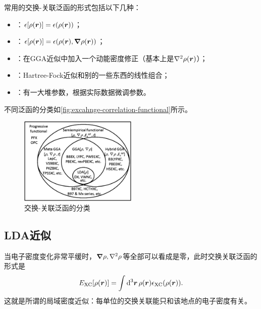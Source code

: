 常用的交换-关联泛函的形式包括以下几种：
\begin{itemize}
    \item {}：$\epsilon[\rho(\vb*{r})] = \epsilon(\rho(\vb*{r}))$；
    \item {}：$\epsilon[\rho(\vb*{r})] = \epsilon(\rho(\vb*{r}), \grad{\rho(\vb*{r})})$；
    \item {}：在GGA近似中加入一个动能密度修正（基本上是$\laplacian \rho(\vb*{r})$）；
    \item {}：Hartree-Fock近似和别的一些东西的线性组合；
    \item {}：有一大堆参数，根据实际数据微调参数。
\end{itemize}
不同泛函的分类如\autoref{fig:excahnge-correlation-functional}所示。

\begin{figure}
    \centering
    \includegraphics[width=0.5\textwidth]{functional-classification.png}
    \caption{交换-关联泛函的分类}
    \label{fig:excahnge-correlation-functional}
\end{figure}

\subsection{LDA近似}

当电子密度变化非常平缓时，$\grad{\rho},\laplacian{\rho}$等全部可以看成是零，此时交换关联泛函的形式是
\begin{equation}
    E_\text{XC}[\rho(\vb*{r})] = \int \dd[3]{\vb*{r}} \rho(\vb*{r}) \epsilon_\text{XC}(\rho(\vb*{r})).
\end{equation}
这就是所谓的局域密度近似：每单位的交换关联能只和该地点的电子密度有关。

